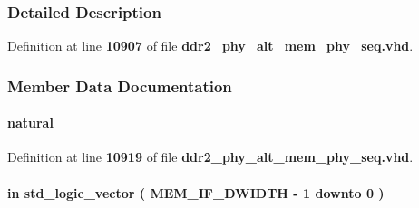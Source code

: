 \subsubsection{Detailed Description}


Definition at line {\bf 10907} of file {\bf ddr2\+\_\+phy\+\_\+alt\+\_\+mem\+\_\+phy\+\_\+seq.\+vhd}.



\subsubsection{Member Data Documentation}
\paragraph[{A\+D\+V\+\_\+\+L\+A\+T\+\_\+\+W\+I\+D\+TH}]{ {\bfseries \textcolor{vhdlchar}{ }} {\bfseries \textcolor{comment}{natural}\textcolor{vhdlchar}{ }} \hspace{0.3cm}{\ttfamily [Generic]}}\label{classddr2__phy__alt__mem__phy__dgwb_a3897150e7063e741d73357e26161c904}


Definition at line {\bf 10919} of file {\bf ddr2\+\_\+phy\+\_\+alt\+\_\+mem\+\_\+phy\+\_\+seq.\+vhd}.

\paragraph[{bypassed\+\_\+rdata}]{ {\bfseries \textcolor{keywordflow}{in}\textcolor{vhdlchar}{ }} {\bfseries \textcolor{comment}{std\+\_\+logic\+\_\+vector}\textcolor{vhdlchar}{ }\textcolor{vhdlchar}{(}\textcolor{vhdlchar}{ }\textcolor{vhdlchar}{ }\textcolor{vhdlchar}{ }\textcolor{vhdlchar}{ }{\bfseries {\bf M\+E\+M\+\_\+\+I\+F\+\_\+\+D\+W\+I\+D\+TH}} \textcolor{vhdlchar}{-\/}\textcolor{vhdlchar}{ } \textcolor{vhdldigit}{1} \textcolor{vhdlchar}{ }\textcolor{keywordflow}{downto}\textcolor{vhdlchar}{ }\textcolor{vhdlchar}{ } \textcolor{vhdldigit}{0} \textcolor{vhdlchar}{ }\textcolor{vhdlchar}{)}\textcolor{vhdlchar}{ }} \hspace{0.3cm}{\ttfamily [Port]}}\label{classddr2__phy__alt__mem__phy__dgwb_a3bb2d878ce1099c7058c4361a25cfe5a}


